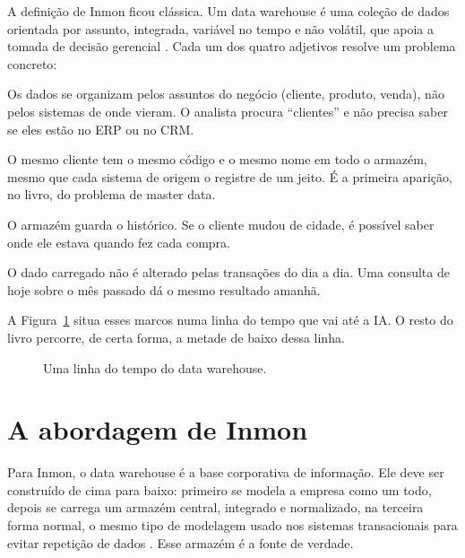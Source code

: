 A definição de Inmon ficou clássica. Um data warehouse é uma coleção de dados orientada
por assunto, integrada, variável no tempo e não volátil, que apoia a tomada de decisão
gerencial \parencite{inmon2005}.  Cada um dos quatro adjetivos resolve um problema concreto:

\begin{description}[style=nextline, leftmargin=1.5em, font=\normalfont\itshape]
  \item[Orientada por assunto] Os dados se organizam pelos assuntos do negócio
    (cliente, produto, venda), não pelos sistemas de onde vieram. O analista procura
    \enquote{clientes} e não precisa saber se eles estão no ERP ou no CRM.
  \item[Integrada] O mesmo cliente tem o mesmo código e o mesmo nome em todo o armazém,
    mesmo que cada sistema de origem o registre de um jeito. É a primeira aparição, no
    livro, do problema de master data.
  \item[Variável no tempo] O armazém guarda o histórico. Se o cliente mudou de cidade, é
    possível saber onde ele estava quando fez cada compra.
  \item[Não volátil] O dado carregado não é alterado pelas transações do dia a dia. Uma
    consulta de hoje sobre o mês passado dá o mesmo resultado amanhã.
\end{description}

A Figura~\ref{fig:dw-linha-tempo} situa esses marcos numa linha do tempo que vai até a
IA. O resto do livro percorre, de certa forma, a metade de baixo dessa linha.

\begin{figure}[htbp]
  \centering
  
  \caption{Uma linha do tempo do data warehouse.}
  \label{fig:dw-linha-tempo}
\end{figure}

\section{A abordagem de Inmon}
\label{sec:inmon}

Para Inmon, o data warehouse é a base corporativa de informação. Ele deve ser
construído de cima para baixo: primeiro se modela a empresa como um todo, depois se
carrega um armazém central, integrado e normalizado, na terceira forma normal, o mesmo
tipo de modelagem usado nos sistemas transacionais para evitar repetição de dados
\parencite{inmon2005}. Esse armazém é a fonte de verdade.

